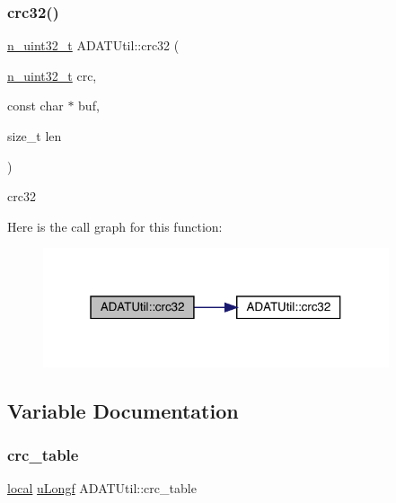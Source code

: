 \subsubsection{\texorpdfstring{crc32()}{crc32()}\hspace{0.1cm}{\footnotesize\ttfamily [2/2]}}
{\footnotesize\ttfamily \mbox{\hyperlink{namespaceADATUtil_ad945a8afa4db2d1f89b731964adae97e}{n\+\_\+uint32\+\_\+t}} A\+D\+A\+T\+Util\+::crc32 (\begin{DoxyParamCaption}\item[{\mbox{\hyperlink{namespaceADATUtil_ad945a8afa4db2d1f89b731964adae97e}{n\+\_\+uint32\+\_\+t}}}]{crc,  }\item[{const char $\ast$}]{buf,  }\item[{size\+\_\+t}]{len }\end{DoxyParamCaption})}



crc32 

Here is the call graph for this function\+:\nopagebreak
\begin{figure}[H]
\begin{center}
\leavevmode
\includegraphics[width=289pt]{de/d19/namespaceADATUtil_aea7a30b468249f17899ebbb9902fb330_cgraph}
\end{center}
\end{figure}


\subsection{Variable Documentation}
\mbox{\label{namespaceADATUtil_a3936457e43366b1c492c10870155ef6c}} 
\subsubsection{\texorpdfstring{crc\_table}{crc\_table}}
{\footnotesize\ttfamily \mbox{\hyperlink{adat__devel_2lib_2io_2adat__crc32_8cc_a08023ea6765c99d60a6a3840cd07156e}{local}} \mbox{\hyperlink{namespaceADATUtil_adf7f8db2cc2f19fe6143cf8a2ad881f4}{u\+Longf}} A\+D\+A\+T\+Util\+::crc\+\_\+table}

